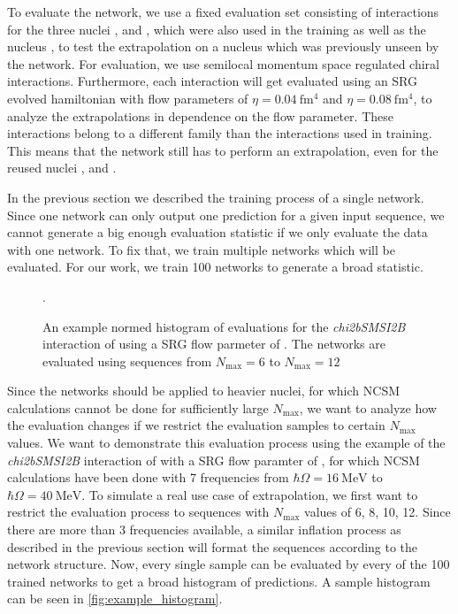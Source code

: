 To evaluate the network, we use a fixed evaluation set consisting of interactions for the three nuclei ,  and , which were also used in the training as well as the nucleus , to test the extrapolation on a nucleus which was previously unseen by the network. For evaluation, we use semilocal momentum space regulated chiral interactions. Furthermore, each interaction will get evaluated using an SRG evolved hamiltonian with flow parameters of $\eta = \SI{0.04}{\femto\metre^4}$ and $\eta = \SI{0.08}{\femto\metre^4}$, to analyze the extrapolations in dependence on the flow parameter. These interactions belong to a different family than the interactions used in training. This means that the network still has to perform an extrapolation, even for the reused nuclei ,  and .

In the previous section we described the training process of a single network. Since one network can only output one prediction for a given input sequence, we cannot generate a big enough evaluation statistic if we only evaluate the data with one network. To fix that, we train multiple networks which will be evaluated. For our work, we train 100 networks to generate a broad statistic.

\begin{figure}
  \centering
  
  \caption{An example normed histogram of evaluations for the \textit{chi2bSMSI2B} interaction of  using a SRG flow parmeter of . The networks are evaluated using sequences from $N_\mathrm{max}=6$ to $N_\mathrm{max}=12$}.
  \label{fig:example_histogram}
\end{figure}
Since the networks should be applied to heavier nuclei, for which NCSM calculations cannot be done for sufficiently large $N_\mathrm{max}$, we want to analyze how the evaluation changes if we restrict the evaluation samples to certain $N_\mathrm{max}$ values. We want to demonstrate this evaluation process using the example of the \textit{chi2bSMSI2B} interaction of  with a SRG flow paramter of , for which NCSM calculations have been done with 7 frequencies from $\hbar\Omega = \SI{16}{\mega\electronvolt}$ to $\hbar\Omega = \SI{40}{\mega\electronvolt}$. To simulate a real use case of extrapolation, we first want to restrict the evaluation process to sequences with $N_\mathrm{max}$ values of 6, 8, 10, 12. Since there are more than 3 frequencies available, a similar inflation process as described in the previous section will format the sequences according to the network structure. Now, every single sample can be evaluated by every of the 100 trained networks to get a broad histogram of predictions. A sample histogram can be seen in \autoref{fig:example_histogram}.


